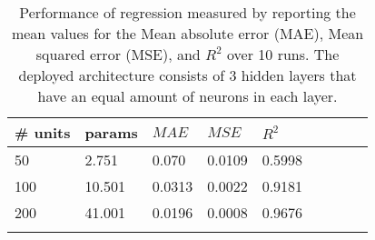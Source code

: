 \documentclass[conference,compsoc]{IEEEtran}
\begin{document}
   \centering
\begin{table}
\centering
\begin{subtable}[t]{0.48\textwidth}
\centering
\begin{tabular}[t]{l l l l l l l l l}
\toprule

\# units & params &$MAE$ &   $MSE$  &$R^2$\\
\midrule

                                          
 50  &2.751 &0.070 &0.0109  &0.5998 \\
                                               
 100 & 10.501 &0.0313 &   0.0022&0.9181 \\
 200 &41.001 &0.0196&  0.0008 &0.9676 \\
 \\



\bottomrule
\end{tabular}
\end{subtable}
\caption{Performance of regression measured by reporting the mean values for the Mean absolute error (MAE), Mean squared error (MSE), and $R^2$ over 10 runs. The deployed architecture consists of 3 hidden layers that have an equal amount of neurons in each layer.\\
 }
\label{fig:reg}
\end{table}
\end{document}
